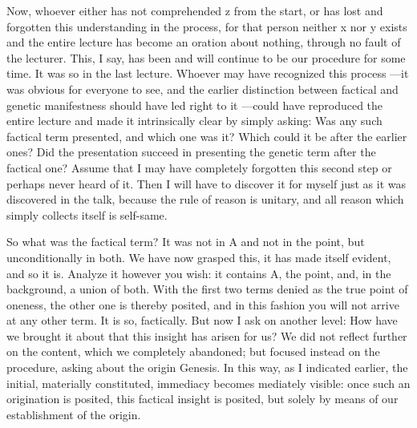Now, whoever either has not comprehended z from the start,
or has lost and forgotten this understanding in the process,
for that person neither x nor y exists and
the entire lecture has become an oration about nothing,
through no fault of the lecturer.
This, I say, has been and will continue to be
our procedure for some time.
It was so in the last lecture.
Whoever may have recognized this process
—it was obvious for everyone to see,
and the earlier distinction between
factical and genetic manifestness
should have led right to it
—could have reproduced the entire lecture
and made it intrinsically clear by simply asking:
Was any such factical term presented,
and which one was it?
Which could it be after the earlier ones?
Did the presentation succeed in
presenting the genetic term after the factical one?
Assume that I may have completely forgotten
this second step or perhaps never heard of it.
Then I will have to discover it for myself
just as it was discovered in the talk,
because the rule of reason is unitary, and
all reason which simply collects itself is self-same.

So what was the factical term?
It was not in A and not in the point,
but unconditionally in both.
We have now grasped this,
it has made itself evident,
and so it is.
Analyze it however you wish:
it contains A, the point, and,
in the background, a union of both.
With the first two terms denied as
the true point of oneness, the other one is thereby posited,
and in this fashion you will not arrive at any other term.
It is so, factically.
But now I ask on another level:
How have we brought it about that
this insight has arisen for us?
We did not reflect further on the content,
which we completely abandoned;
but focused instead on the procedure,
asking about the origin {Genesis}.
In this way, as I indicated earlier,
the initial, materially constituted,
immediacy becomes mediately visible:
once such an origination is posited,
this factical insight is posited,
but solely by means of
our establishment of the origin.

